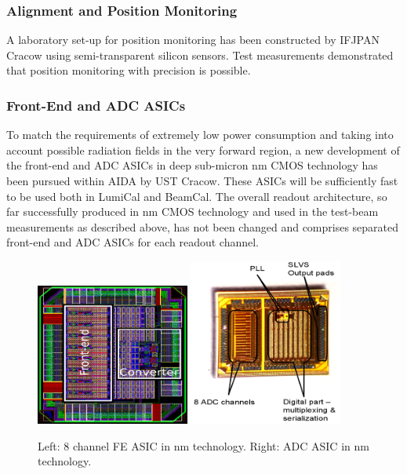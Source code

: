 \subsubsection{Alignment and Position Monitoring }

A laboratory set-up for position monitoring has been constructed by IFJPAN Cracow using semi-transparent
silicon sensors. Test measurements demonstrated that position monitoring with \micron precision is possible.

\subsubsection{Front-End and ADC ASICs}


To match the requirements of extremely low power consumption and taking into account possible radiation
fields in the very forward region, a new development of the front-end and ADC ASICs in deep sub-micron
\unit[130]{nm} CMOS technology has been
pursued within AIDA by UST Cracow.
These ASICs will be sufficiently fast to be used both in LumiCal and BeamCal.
The overall readout architecture, so far successfully produced in \unit[350]{nm} CMOS technology and used in the test-beam
measurements as described above, has not been changed and comprises separated front-end
and ADC ASICs for each readout channel.
\begin{figure}[hbp]
\centering
    \includegraphics[width=0.45\textwidth]{Calorimeter/FCAL/figs/FE_ASIC.png} \hfill
	\includegraphics[width=0.45\textwidth]{Calorimeter/FCAL/figs/ADC_ASIC_2.png}
	\caption{Left: 8 channel FE ASIC in \unit[130]{nm} technology.
		 	 Right: ADC ASIC in \unit[130]{nm} technology.}
    \label{fig:ASIC_ADC}
\end{figure}
